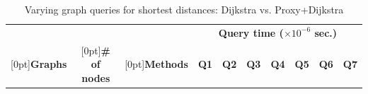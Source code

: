 \begin{table}[t!]
\caption{Varying graph queries  for shortest distances: Dijkstra  vs. Proxy+Dijkstra}\label{tab:performance_dist_queries_dj}
\vspace{-2ex}
\begin{center}
\begin{scriptsize}

\begin{tabular}{|c|c|c||r|r|r|r|r|r|r|}
\hline
  & &  & \multicolumn{7}{c|}{\bf Query time ($\times 10^{-6}$ sec.)} \\
\cline{4-10}

\raisebox{1.5ex}[0pt]{\bf Graphs}&\raisebox{1.5ex}[0pt]{\bf \# of nodes}  & \raisebox{1.5ex}[0pt]{\bf Methods} & {\bf Q1} & {\bf Q2} & {\bf Q3} & {\bf Q4} & {\bf Q5} & {\bf Q6} & {\bf Q7}  \\ \hline \hline


\end{tabular}
\end{scriptsize}
\end{center}
\end{table}

